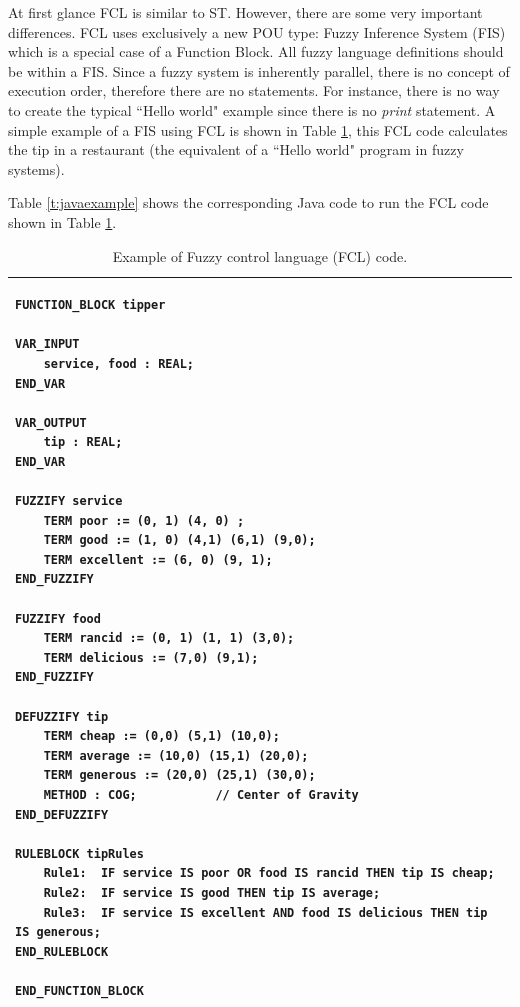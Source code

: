 \documentclass[conference]{IEEEtran}
\begin{document}
At first glance FCL is similar to ST. 
However, there are some very important differences. FCL uses exclusively a new POU type: Fuzzy Inference System (FIS) which is a special case of a Function Block. 
All fuzzy language definitions should be within a FIS. Since a fuzzy system is inherently parallel, there is no concept of execution order, therefore there are no statements. 
For instance, there is no way to create the typical ``Hello world" example since there is no \textit{print} statement. 
A simple example of a FIS using FCL is shown in Table \ref{t:example}, this FCL code calculates the tip in a restaurant (the equivalent of a ``Hello world" program in fuzzy systems).

Table \ref{t:javaexample} shows the corresponding Java code to run the FCL code shown in Table \ref{t:example}.

\lstset{tabsize=2,frame=none}

\begin{table}[!t]
\renewcommand{\arraystretch}{1.3}
\caption{Example of Fuzzy control language (FCL) code.}
\label{t:example}
\centering
\begin{tabular}{|l|}
\hline
\begin{lstlisting}
FUNCTION_BLOCK tipper

VAR_INPUT				
	service, food : REAL;
END_VAR

VAR_OUTPUT
	tip : REAL;
END_VAR

FUZZIFY service
	TERM poor := (0, 1) (4, 0) ;
	TERM good := (1, 0) (4,1) (6,1) (9,0);
	TERM excellent := (6, 0) (9, 1);
END_FUZZIFY

FUZZIFY food
	TERM rancid := (0, 1) (1, 1) (3,0);
	TERM delicious := (7,0) (9,1);
END_FUZZIFY

DEFUZZIFY tip
	TERM cheap := (0,0) (5,1) (10,0);
	TERM average := (10,0) (15,1) (20,0);
	TERM generous := (20,0) (25,1) (30,0);
	METHOD : COG;			// Center of Gravity
END_DEFUZZIFY

RULEBLOCK tipRules
	Rule1:	IF service IS poor OR food IS rancid THEN tip IS cheap;
	Rule2:	IF service IS good THEN tip IS average;
	Rule3:	IF service IS excellent AND food IS delicious THEN tip IS generous;
END_RULEBLOCK

END_FUNCTION_BLOCK
\end{lstlisting} \\
\hline
\end{tabular}
\end{table}
\end{document}
